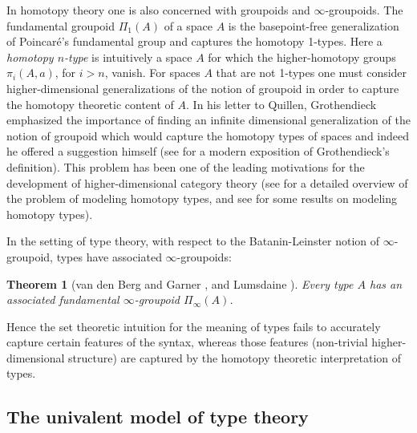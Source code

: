 \documentclass[11pt]{amsart}
\newtheorem{theorem}{Theorem}[section]
\theoremstyle{definition}
\theoremstyle{remark}
\numberwithin{equation}{section}
\begin{document}
In homotopy theory one is also concerned with groupoids and
$\infty$-groupoids.  The fundamental groupoid $\Pi_{1}(A)$
of a space $A$ is the basepoint-free generalization of Poincar\'{e}'s
\cite{Poincare:1895vx} fundamental group and captures the homotopy
1-types.  Here a \emph{homotopy $n$-type}
is intuitively a space $A$ for which the higher-homotopy groups
$\pi_{i}(A,a)$, for $i>n$, vanish.  For spaces $A$ that are not
1-types one must consider higher-dimensional generalizations of
the notion of groupoid in order to capture the homotopy theoretic
content of $A$.  In his letter to Quillen, Grothendieck \cite{Grothendieck:2005wy} emphasized the importance of
finding an infinite dimensional generalization of the notion of
groupoid which would capture the homotopy types of spaces
and indeed he offered a suggestion himself (see \cite{Maltsiniotis}
for a modern exposition of Grothendieck's definition).  This problem has been one of
the leading motivations for the development of higher-dimensional
category theory (see \cite{Baues:1995js} for a
detailed overview of the problem of modeling homotopy types, and see
\cite{Loday:1982vg,Kapranov:1991uw,Simpson:1998wi,Tamsamani:1999ia,Cisinski:2007by}
for some results on modeling homotopy types).

In the setting of type theory, with respect to the Batanin-Leinster
\cite{Batanin:1998kp,Leinster:2004fi} notion of $\infty$-groupoid,
types have associated $\infty$-groupoids:
\begin{theorem}[van den Berg and Garner \cite{vandenBerg:2011ec}, and
  Lumsdaine \cite{Lumsdaine:2010ew}]
  Every type $A$ has an associated fundamental $\infty$-groupoid $\Pi_{\infty}(A)$.
\end{theorem}
Hence the set theoretic intuition for
the meaning of types fails to accurately capture certain features of
the syntax, whereas those features (non-trivial higher-dimensional
structure) are captured by the homotopy theoretic interpretation of
types.

\subsection{The univalent model of type theory}\label{sec:univalent_model}
\end{document}
